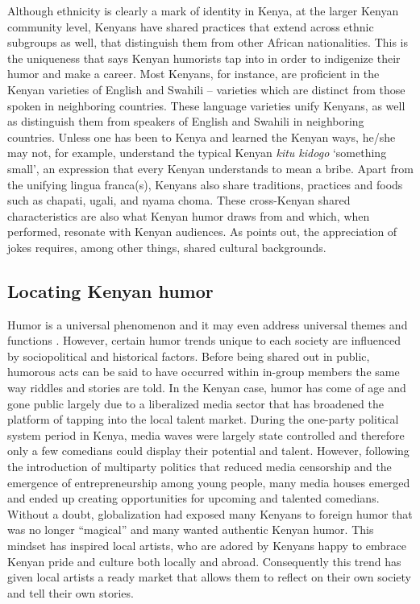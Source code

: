 \documentclass[output=paper]{langsci/langscibook}
\begin{document}
Although ethnicity is clearly a mark of identity in Kenya, at the larger Kenyan community level, Kenyans have shared practices that extend across ethnic subgroups as well, that distinguish them from other African nationalities. This is the uniqueness that \citet[5]{Tumusiime2013} says Kenyan humorists tap into in order to indigenize their humor and make a career. Most Kenyans, for instance, are proficient in the Kenyan varieties of English and Swahili – varieties which are distinct from those spoken in neighboring countries. These language varieties unify Kenyans, as well as distinguish them from speakers of English and Swahili in neighboring countries. Unless one has been to Kenya and learned the Kenyan ways, he/she may not, for example, understand the typical Kenyan \textit{kitu kidogo }‘something small’, an expression that every Kenyan understands to mean a bribe. Apart from the unifying lingua franca(s), Kenyans also share traditions, practices and foods such as chapati, ugali, and nyama choma. These cross-Kenyan shared characteristics are also what Kenyan humor draws from and which, when performed, resonate with Kenyan audiences. As \citet{Chiaro1992} points out, the appreciation of jokes requires, among other things, shared cultural backgrounds.


\subsection{Locating Kenyan humor }\label{sec:muaka:1.2}

Humor is a universal phenomenon and it may even address universal themes and functions \citep[xiii]{NorrickChiaro2009}. However, certain humor trends unique to each society are influenced by sociopolitical and historical factors. Before being shared out in public, humorous acts can be said to have occurred within in-group members the same way riddles and stories are told. In the Kenyan case, humor has come of age and gone public largely due to a liberalized media sector that has broadened the platform of tapping into the local talent market. During the one-party political system period in Kenya, media waves were largely state controlled and therefore only a few comedians could display their potential and talent. However, following the introduction of multiparty politics that reduced media censorship and the emergence of entrepreneurship among young people, many media houses emerged and ended up creating opportunities for upcoming and talented comedians. Without a doubt, globalization had exposed many Kenyans to foreign humor that was no longer “magical” and many wanted authentic Kenyan humor. This mindset has inspired local artists, who are adored by Kenyans happy to embrace Kenyan pride and culture both locally and abroad. Consequently this trend has given local artists a ready market that allows them to reflect on their own society and tell their own stories. 
\end{document}
